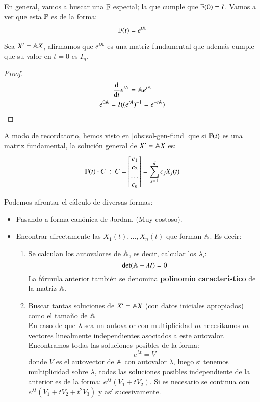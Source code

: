 En general, vamos a buscar una $\mathbb{F}$ especial; la que cumple que $\mathbb{F}(0) = I$. Vamos a ver que esta $\mathbb{F}$ es de la forma:
$$
    \mathbb{F}(t) = e^{t\mathbb{A}}
$$
\begin{pro}
    Sea $X' = \mathbb{A} X$, afirmamos que $e^{t\mathbb{A}}$ es una matriz fundamental que además cumple que su valor en $t=0$ es $I_{n}$.
\end{pro}
\begin{proof}
    \begin{gather*}
        \frac{\mathrm{d}}{\mathrm{d}t} e^{t\mathbb{A}} = \mathbb{A} e^{t\mathbb{A}}\\
        e^{0\mathbb{A}} = I ((e^{tA})^{-1} = e^{-t\mathbb{A}})
    \end{gather*}
\end{proof}
A modo de recordatorio, hemos visto en \ref{obs:sol-gen-fund} que si $\mathbb{F}(t)$ es una matriz fundamental, la solución general de $X' = \mathbb{A} X$ es:
$$
    \F(t) \cdot C\ :\ C = \mx{c_1\\c_2\\\ldots\\c_n} = \sum_{j=1}^d c_jX_j(t)
$$
\begin{eg}
    Podemos afrontar el cálculo de diversas formas:
    \begin{itemize}
        \item Pasando a forma canónica de Jordan. (Muy costoso).
        \item Encontrar directamente las $X_1(t), \ldots, X_n(t)$ que forman $\mathbb{A}$. Es decir:
        \begin{enumerate}
            \item Se calculan los autovalores de $\mathbb{A}$, es decir, calcular los $\lambda_i$:
                $$
                    \det(\mathbb{A}-\lambda I) = 0
                $$
                La fórmula anterior también se denomina \textbf{polinomio característico} de la matriz $\mathbb{A}$.
            \item Buscar tantas soluciones de $X'=\mathbb{A} X$ (con datos iniciales apropiados) como el tamaño de $\mathbb{A}$\\
                En caso de que $\lambda$ sea un autovalor con multiplicidad $m$ necesitamos $m$ vectores linealmente independientes asociados a este autovalor. Encontramos todas las soluciones posibles de la forma:
                $$
                    e^{\lambda t} = V
                $$
                donde $V$ es el autovector de $\mathbb{A}$ con autovalor $\lambda$, luego si tenemos multiplicidad sobre $\lambda$, todas las soluciones posibles independiente de la anterior es de la forma: $e^{\lambda t} (V_1 + t V_2)$. Si es necesario se continua con $e^{\lambda t} (V_1 + tV_2 + t^2V_3)$ y así sucesivamente.
        \end{enumerate}
    \end{itemize}
\end{eg}
